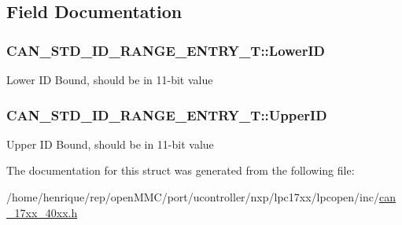\subsection{Field Documentation}
\hypertarget{structCAN__STD__ID__RANGE__ENTRY__T_a8e71d9944856371e26c1f42fcdc124f7}{
\subsubsection[{Lower\-I\-D}]{ C\-A\-N\-\_\-\-S\-T\-D\-\_\-\-I\-D\-\_\-\-R\-A\-N\-G\-E\-\_\-\-E\-N\-T\-R\-Y\-\_\-\-T\-::\-Lower\-I\-D}}\label{structCAN__STD__ID__RANGE__ENTRY__T_a8e71d9944856371e26c1f42fcdc124f7}
Lower I\-D Bound, should be in 11-\/bit value \hypertarget{structCAN__STD__ID__RANGE__ENTRY__T_a5c92aad98ca02e625a651b5509a4bd6e}{
\subsubsection[{Upper\-I\-D}]{ C\-A\-N\-\_\-\-S\-T\-D\-\_\-\-I\-D\-\_\-\-R\-A\-N\-G\-E\-\_\-\-E\-N\-T\-R\-Y\-\_\-\-T\-::\-Upper\-I\-D}}\label{structCAN__STD__ID__RANGE__ENTRY__T_a5c92aad98ca02e625a651b5509a4bd6e}
Upper I\-D Bound, should be in 11-\/bit value 

The documentation for this struct was generated from the following file\-:\begin{DoxyCompactItemize}
\item 
/home/henrique/rep/open\-M\-M\-C/port/ucontroller/nxp/lpc17xx/lpcopen/inc/\hyperlink{can__17xx__40xx_8h}{can\-\_\-17xx\-\_\-40xx.\-h}\end{DoxyCompactItemize}
